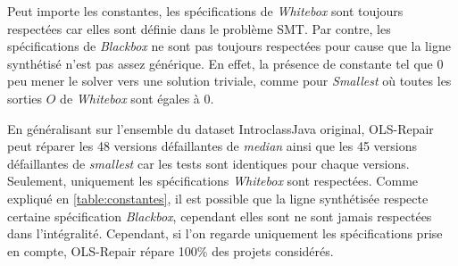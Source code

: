 \par Peut importe les constantes, les spécifications de \textit{Whitebox} sont toujours respectées car elles sont définie dans le problème SMT. Par contre, les spécifications de  \textit{Blackbox} ne sont pas toujours respectées pour cause que la ligne synthétisé n'est pas assez générique. En effet, la présence de constante tel que 0 peu mener le solver vers une solution triviale, comme pour \textit{Smallest} où toutes les sorties $O$ de \textit{Whitebox} sont égales à 0.

\newpage
En généralisant sur l'ensemble du dataset IntroclassJava original, OLS-Repair peut réparer les 48 versions défaillantes de \textit{median} ainsi que les 45 versions défaillantes de \textit{smallest} car les tests sont identiques pour chaque versions. Seulement, uniquement les spécifications \textit{Whitebox} sont respectées. Comme expliqué en \ref{table:constantes}, il est possible que la ligne synthétisée respecte certaine spécification \textit{Blackbox}, cependant elles sont ne sont jamais respectées dans l'intégralité. Cependant, si l'on regarde uniquement les spécifications prise en compte, OLS-Repair répare 100\% des projets considérés.





